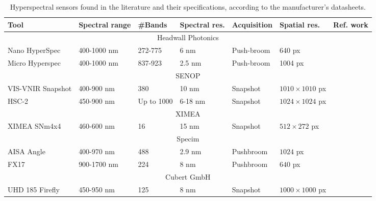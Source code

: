 \renewcommand{\arraystretch}{1.2}
\begin{table}[h]
    \small
    \caption{Hyperspectral sensors found in the literature and their specifications, according to the manufacturer's datasheets.}
    \label{table:hyperspectral_devices}
    \begin{tabular}{lllllll}
        \toprule
        Tool & Spectral range & \#Bands & Spectral res. & Acquisition & Spatial res. & Ref. work \\
        \midrule
        \multicolumn{7}{c}{Headwall Photonics}\\
        Nano HyperSpec & 400-1000 \si{\nano\meter}   & 272-775 & 6 \si{\nano\meter}  & Push-broom    & 640 px  &\cite{sankey_uav_2018, sousa_uav-based_2022}\\
        Micro Hyperspec & 400-1000 \si{\nano\meter}   & 837-923 & 2.5 \si{\nano\meter}  & Push-broom    & 1004 px  &\cite{sousa_uav-based_2022}\\
        \cmidrule{1-7}
        \multicolumn{7}{c}{SENOP}\\
        VIS-VNIR Snapshot & 400-900 \si{\nano\meter}   & 380 & 10 \si{\nano\meter}  & Snapshot    & $1010\times1010$ px & \cite{sousa_uav-based_2022}\\
        HSC-2 & 450-900 \si{\nano\meter}   & Up to 1000 & 6-18 \si{\nano\meter}  & Snapshot    & $1024\times1024$ px & \cite{sousa_uav-based_2022}\\
        \cmidrule{1-7}
        \multicolumn{7}{c}{XIMEA}\\
        XIMEA SNm4x4 & 460-600 \si{\nano\meter}   & 16 & 15 \si{\nano\meter}  & Snapshot    & $512\times272$ px & \cite{gao_cbff-net_2023}\\
        \cmidrule{1-7}
        \multicolumn{7}{c}{Specim}\\
        AISA Angle & 400-970 \si{\nano\meter}   & 488 & 2.9 \si{\nano\meter}  & Pushbroom    & $1024$ px & \cite{windrim_unsupervised_2023}\\
        FX17 & 900-1700 \si{\nano\meter}   & 224 & 8 \si{\nano\meter}  & Pushbroom    & $640$ px & \cite{sousa_uav-based_2022}\\
        \cmidrule{1-7}
        \multicolumn{7}{c}{Cubert GmbH}\\
        UHD 185 Firefly & 450-950 \si{\nano\meter}   & 125 & 8 \si{\nano\meter}  & Snapshot    & $1000\times1000$ px & \cite{yue_comparison_2018}\\
        \bottomrule
    \end{tabular}
\end{table}
\renewcommand{\arraystretch}{1}

